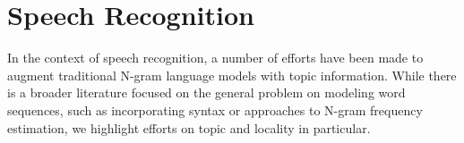 %
%
%
%


\section{Speech Recognition}
\label{sec:bkgASR}
In the context of speech recognition, a number of efforts have been made to augment traditional N-gram language models with topic information.  While there is a broader literature focused on the general problem on modeling word sequences, such as incorporating syntax or approaches to N-gram frequency estimation, we highlight efforts on topic and locality in particular.

